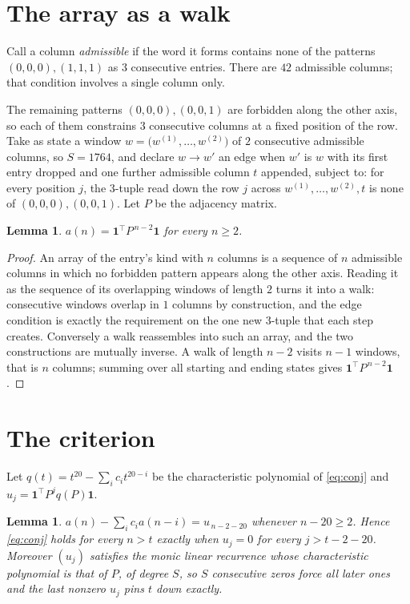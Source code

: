 \documentclass[11pt,a4paper]{article}
\theoremstyle{plain}
\newtheorem{lemma}[theorem]{Lemma}
\theoremstyle{definition}
\begin{document}
\section{The array as a walk}

Call a column \emph{admissible} if the word it forms contains none of the patterns
$(0,0,0), (1,1,1)$ as $3$ consecutive entries. There are $42$ admissible columns; that condition
involves a single column only.

The remaining patterns $(0,0,0), (0,0,1)$ are forbidden along the other axis, so each of them
constrains $3$ consecutive columns at a fixed position of the row. Take as state a
window $w=\bigl(w^{(1)},\dots,w^{(2)}\bigr)$ of $2$ consecutive admissible
columns, so $S=1764$, and declare $w\to w'$ an edge when $w'$ is $w$ with its first entry
dropped and one further admissible column $t$ appended, subject to: for every position
$j$, the $3$-tuple read down the row $j$ across $w^{(1)},\dots,w^{(2)},t$
is none of $(0,0,0), (0,0,1)$. Let $P$ be the adjacency matrix.

\begin{lemma}\label{lem:walk}
$a(n)=\mathbf{1}^{\!\top}P^{\,n-2}\mathbf{1}$ for every $n\ge2$.
\end{lemma}

\begin{proof}
An array of the entry's kind with $n$ columns is a sequence of $n$ admissible columns in
which no forbidden pattern appears along the other axis. Reading it as the sequence of its
overlapping windows of length $2$ turns it into a walk: consecutive windows overlap in
$1$ columns by construction, and the edge condition is exactly the requirement on the one
new $3$-tuple that each step creates. Conversely a walk reassembles into such an array,
and the two constructions are mutually inverse. A walk of length $n-2$ visits $n-1$
windows, that is $n$ columns; summing over all starting and ending states gives
$\mathbf{1}^{\!\top}P^{\,n-2}\mathbf{1}$.
\end{proof}

\section{The criterion}

Let $q(t)=t^{20}-\sum_i c_i t^{20-i}$ be the characteristic polynomial of
\eqref{eq:conj} and $u_j=\mathbf{1}^{\!\top}P^{j}q(P)\mathbf{1}$.

\begin{lemma}\label{lem:crit}
$a(n)-\sum_i c_i a(n-i)=u_{\,n-2-20}$ whenever $n-20\ge2$. Hence
\eqref{eq:conj} holds for every $n>t$ exactly when $u_j=0$ for every
$j>t-2-20$. Moreover $(u_j)$ satisfies the monic linear recurrence whose
characteristic polynomial is that of $P$, of degree $S$, so $S$ consecutive zeros force all
later ones and the last nonzero $u_j$ pins $t$ down exactly.
\end{lemma}
\end{document}
